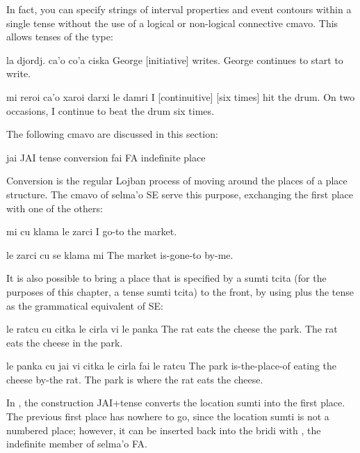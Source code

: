 In fact, you can specify strings of interval properties and
    event contours within a single tense without the use of a
    logical or non-logical connective cmavo. This allows tenses of
    the type:
\begin{example}
la djordj. ca'o co'a ciska\n
George  [initiative] writes.\n
George continues to start to write.
\end{example}

\begin{example}
mi reroi ca'o xaroi darxi le damri\n
I  [continuitive] [six times] hit the drum.\n
On two occasions, I continue to beat the drum six times.
\end{example}



The following cmavo are discussed in this section:

   jai JAI tense conversion
    fai FA  indefinite place

Conversion is the regular Lojban process of moving around the
    places of a place structure. The cmavo of selma'o SE serve this
    purpose, exchanging the first place with one of the others:
\begin{example}
mi cu klama le zarci\n
I go-to the market.
\end{example}

\begin{example}
le zarci cu se klama mi\n
The market is-gone-to by-me.
\end{example}

It is also possible to bring a place that is specified by a
    sumti tcita (for the purposes of this chapter, a tense sumti
    tcita) to the front, by using  plus the tense as the
    grammatical equivalent of SE:
\begin{example}
le ratcu cu citka le cirla vi le panka\n
The rat eats the cheese  the park.\n
The rat eats the cheese in the park.
\end{example}

\begin{example}
le panka cu jai vi citka le cirla fai le ratcu\n
The park is-the-place-of eating the cheese by-the rat.\n
The park is where the rat eats the cheese.
\end{example}

In , the construction
    JAI+tense converts the location sumti into the first place. The
    previous first place has nowhere to go, since the location
    sumti is not a numbered place; however, it can be inserted back
    into the bridi with , the indefinite member of selma'o
    FA. 

